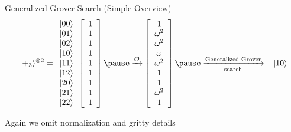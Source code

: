 \documentclass[xcolor=dvipsnames]{beamer}
\begin{document}
\begin{frame}{Generalized Grover Search (Simple Overview)}
$$
          \vert +_3 \rangle ^{\otimes 2}=
          \begin{array}{c c c c c c c c c}
          \vert 00 \rangle\\
          \vert 01 \rangle \\
          \vert 02\rangle \\ 
          \vert 10\rangle\\
          \vert 11\rangle\\
          \vert 12 \rangle \\
          \vert 20 \rangle \\
          \vert 21\rangle \\
          \vert 22 \rangle\\
          \end{array}
          \left[
          \begin{array}{c}
          1 \\
          1 \\
          1 \\
          1 \\
          1 \\
          1 \\
          1 \\
          1 \\
          1 \\
          \end{array}
          \right]\pause
          \xrightarrow{\mathcal{O}}
          \left[
          \begin{array}{c}
          1 \\
          \omega^2 \\
          \omega^2 \\
          \omega \\
          \omega^2 \\
          1 \\
          1 \\
          \omega^2 \\
          1 \\
          \end{array}
          \right]\pause
          \xrightarrow[\text{search}]{\text{Generalized Grover}}\hspace{.3cm}
          \vert 10\rangle                 
$$\pause

\begin{center}

Again we omit normalization and gritty details

\end{center}

\end{frame}
\end{document}
